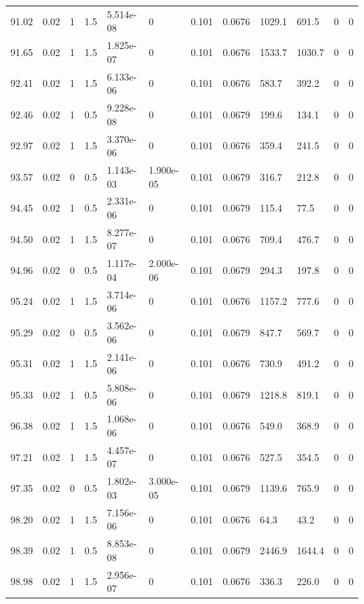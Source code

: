 \documentclass[preview]{standalone}
\begin{document}
{{{{{{\begin{tabular}{L{1.2cm}C{1.2cm} C{0.3cm}C{0.5cm} C{1.4cm}C{1.4cm} C{1.4cm}C{1.4cm} C{1.6cm}C{1.6cm} C{1.6cm}C{1.6cm}}
  91.02  &  0.02  & 1     & 1.5 &  5.514e-08  & 0  &  0.101&   0.0676& 1029.1 & 691.5   &  0 & 0  \\ 
  91.65  &  0.02  & 1     & 1.5 &  1.825e-07  & 0  &  0.101&   0.0676& 1533.7 & 1030.7   &  0 & 0  \\ 
  92.41  &  0.02  & 1     & 1.5 &  6.133e-06  & 0  &  0.101&   0.0676& 583.7 & 392.2   &  0 & 0  \\ 
  92.46  &  0.02  & 1     & 0.5 &  9.228e-08  & 0  &  0.101&   0.0679& 199.6 & 134.1   &  0 & 0  \\ 
  92.97  &  0.02  & 1     & 1.5 &  3.370e-06  & 0  &  0.101&   0.0676& 359.4 & 241.5   &  0 & 0  \\ 
  93.57  &  0.02  & 0     & 0.5 &  1.143e-03  & 1.900e-05  &  0.101&   0.0679& 316.7 & 212.8   &  0 & 0  \\ 
  94.45  &  0.02  & 1     & 0.5 &  2.331e-06  & 0  &  0.101&   0.0679& 115.4 & 77.5   &  0 & 0  \\ 
  94.50  &  0.02  & 1     & 1.5 &  8.277e-07  & 0  &  0.101&   0.0676& 709.4 & 476.7   &  0 & 0  \\ 
  94.96  &  0.02  & 0     & 0.5 &  1.117e-04  & 2.000e-06  &  0.101&   0.0679& 294.3 & 197.8   &  0 & 0  \\ 
  95.24  &  0.02  & 1     & 1.5 &  3.714e-06  & 0  &  0.101&   0.0676& 1157.2 & 777.6   &  0 & 0  \\ 
  95.29  &  0.02  & 0     & 0.5 &  3.562e-06  & 0  &  0.101&   0.0679& 847.7 & 569.7   &  0 & 0  \\ 
  95.31  &  0.02  & 1     & 1.5 &  2.141e-06  & 0  &  0.101&   0.0676& 730.9 & 491.2   &  0 & 0  \\ 
  95.33  &  0.02  & 1     & 0.5 &  5.808e-06  & 0  &  0.101&   0.0679& 1218.8 & 819.1   &  0 & 0  \\ 
  96.38  &  0.02  & 1     & 1.5 &  1.068e-06  & 0  &  0.101&   0.0676& 549.0 & 368.9   &  0 & 0  \\ 
  97.21  &  0.02  & 1     & 1.5 &  4.457e-07  & 0  &  0.101&   0.0676& 527.5 & 354.5   &  0 & 0  \\ 
  97.35  &  0.02  & 0     & 0.5 &  1.802e-03  & 3.000e-05  &  0.101&   0.0679& 1139.6 & 765.9   &  0 & 0  \\ 
  98.20  &  0.02  & 1     & 1.5 &  7.156e-06  & 0  &  0.101&   0.0676& 64.3 & 43.2   &  0 & 0  \\ 
  98.39  &  0.02  & 1     & 0.5 &  8.853e-08  & 0  &  0.101&   0.0679& 2446.9 & 1644.4   &  0 & 0  \\ 
  98.98  &  0.02  & 1     & 1.5 &  2.956e-07  & 0  &  0.101&   0.0676& 336.3 & 226.0   &  0 & 0  \\ 

\end{tabular}}}}}}}
\end{document}

